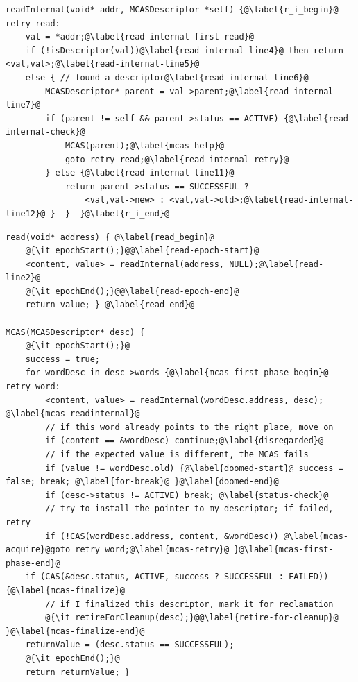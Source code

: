 \begin{lstlisting}[caption={The \readInternal\ auxiliary function, used by our algorithm.},label=list:readInternal,float,keywords={}]
readInternal(void* addr, MCASDescriptor *self) {@\label{r_i_begin}@
retry_read:							
	val = *addr;@\label{read-internal-first-read}@
	if (!isDescriptor(val))@\label{read-internal-line4}@ then return <val,val>;@\label{read-internal-line5}@
	else { // found a descriptor@\label{read-internal-line6}@
		MCASDescriptor* parent = val->parent;@\label{read-internal-line7}@
		if (parent != self && parent->status == ACTIVE) {@\label{read-internal-check}@
			MCAS(parent);@\label{mcas-help}@
			goto retry_read;@\label{read-internal-retry}@
		} else {@\label{read-internal-line11}@
			return parent->status == SUCCESSFUL ?
			    <val,val->new> : <val,val->old>;@\label{read-internal-line12}@ }  }  }@\label{r_i_end}@
\end{lstlisting}

\begin{lstfloat}
\begin{lstlisting}[caption={Our main algorithm. Commands in {\it italic} are related to memory reclamation (discussed in a later section).},label=list:algo,firstnumber=last,keywords={}]
read(void* address) { @\label{read_begin}@
	@{\it epochStart();}@@\label{read-epoch-start}@
	<content, value> = readInternal(address, NULL);@\label{read-line2}@
	@{\it epochEnd();}@@\label{read-epoch-end}@
	return value; } @\label{read_end}@

MCAS(MCASDescriptor* desc) {
	@{\it epochStart();}@
	success = true;
	for wordDesc in desc->words {@\label{mcas-first-phase-begin}@
retry_word:
		<content, value> = readInternal(wordDesc.address, desc); @\label{mcas-readinternal}@
		// if this word already points to the right place, move on
		if (content == &wordDesc) continue;@\label{disregarded}@
		// if the expected value is different, the MCAS fails
		if (value != wordDesc.old) {@\label{doomed-start}@ success = false; break; @\label{for-break}@ }@\label{doomed-end}@
		if (desc->status != ACTIVE) break; @\label{status-check}@
		// try to install the pointer to my descriptor; if failed,	retry
		if (!CAS(wordDesc.address, content, &wordDesc)) @\label{mcas-acquire}@goto retry_word;@\label{mcas-retry}@ }@\label{mcas-first-phase-end}@
	if (CAS(&desc.status, ACTIVE, success ? SUCCESSFUL : FAILED)){@\label{mcas-finalize}@
		// if I finalized this descriptor, mark it for reclamation
		@{\it retireForCleanup(desc);}@@\label{retire-for-cleanup}@ }@\label{mcas-finalize-end}@
	returnValue = (desc.status == SUCCESSFUL);
	@{\it epochEnd();}@
	return returnValue; }
\end{lstlisting}
\end{lstfloat}

